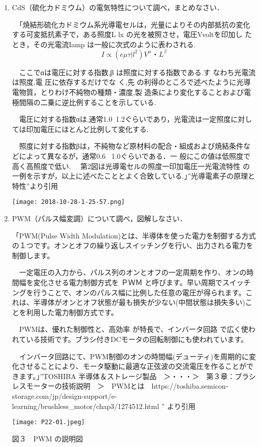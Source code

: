\documentclass {ujarticle}
\begin{document}
 \begin{enumerate}
 
 \item CdS（硫化カドミウム）の電気特性について調べ，まとめなさい．
 
 
　「焼結形硫化カドミウム系光導電セルは，光量によりその内部抵抗の変化する可変抵抗素子で，ある照度L lx の光を被照させ，電圧Vvoltを印加し たとき，その光電流Iamp は一般に次式のように表わされる.
\[
I\propto(e\mu\tau|l^{2})V^{\alpha}・L^{\beta}
\]

　ここでαは電圧に対する指数,β は照度に対する指数である.す なわち光電流は照度,電 圧に依存するだけでな く,先 の利得のところで述べたように光導電物質，とりわけ不純物の種類・濃度,製 造条により変化することおよび電極間隔の二乗に逆比例することを示している.
 
　電圧に対する指数αは,通常1.0~1.2ぐらいであり，光電流は一定照度に対しては印加電圧にほとんど比例して変化する.

　照度に対する指数βは，不純物など原材料の配合・組成および焼結条件などによって異なるが，通常0.6~ 1.0ぐらいである．一 般にこの値は低照度で高く高照度で低い.
　第2図は光導電セルの照度一印加電圧一光電流特性 の一例を示すが，以上に述べたこととよく合致している.」”光導電素子の原理と特性”より引用

\begin{center}
\texttt{[image: 2018-10-28-1-25-57.png]}
\end{center}

 \item PWM（パルス幅変調）について調べ，図解しなさい． 
 
   「PWM(Pulse Width Modulation)とは、半導体を使った電力を制御する方式の１つです。オンとオフの繰り返しスイッチングを行い、出力される電力を制御します。

　一定電圧の入力から、パルス列のオンとオフの一定周期を作り、オンの時間幅を変化させる電力制御方式を ＰＷＭ と呼びます。早い周期でスイッチングを行うことで、オンのパルス幅に比例した任意の電圧が得られます。これは、半導体がオンとオフ状態が最も損失が少ない(中間状態は損失多い)ことを利用した電力制御方式です。

　PWMは、優れた制御性と、高効率 が特長で、インバータ回路 で広く使われている技術です。ブラシ付きDCモータの回転制御にも使われています。 

　インバータ回路にて、PWM制御のオンの時間幅(デューティ)を周期的に変化させることにより、モータ駆動に最適な正弦波の交流電圧を作ることができます。」”TOSHIBA 半導体＆ストレージ製品　＞・・・＞　第３章：ブラシレスモーターの技術説明　＞　PWMとは　https://toshiba.semicon-storage.com/jp/design-support/e-learning/brushless\_motor/chap3/1274512.html ” より引用　
 
 \begin{center}
 \texttt{[image: P22-01.jpeg]}
 
 図３　PWM の説明図
 \end{center}
 
 \end{enumerate}
\end{document}
